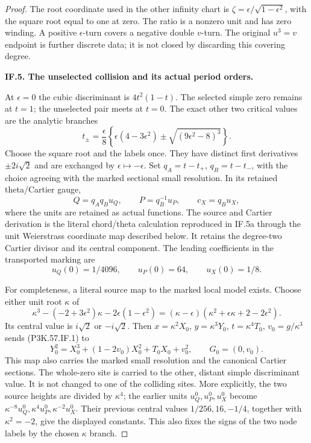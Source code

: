 \begin{proof}
The root coordinate used in the other infinity chart is
\(\zeta=\epsilon/\sqrt{1-\epsilon^2}\), with the square root equal to one
at zero. The ratio is a nonzero unit and has zero winding. A positive
\(\epsilon\)-turn covers a negative double \(v\)-turn. The original
\(u^3=v\) endpoint is further discrete data; it is not closed by
discarding this covering degree.

\par\medskip\noindent\textbf{IF.5. The unselected collision and its actual period orders.}\par\nopagebreak[4]

At \(\epsilon=0\) the cubic discriminant is \(4t^2(1-t)\). The selected
simple zero remains at \(t=1\); the unselected pair meets at \(t=0\).
The exact other two critical values are the analytic branches
\[
 t_\pm=\frac{\epsilon}{8}
 \left\{\epsilon(4-3\epsilon^2)
          \pm\sqrt{(9\epsilon^2-8)^3}\right\}.           \tag{P3K.57.IF.13}
\]
Choose the square root and the labels once. They have distinct first
derivatives \(\pm2i\sqrt2\) and are exchanged by \(\epsilon\mapsto-\epsilon\).
Set \(q_A=t-t_+\), \(q_B=t-t_-\), with the choice agreeing with the marked
sectional small resolution. In its retained theta/Cartier gauge,
\[
 Q=q_Aq_Bu_Q,\qquad P=q_B^{-1}u_P,\qquad
 c_X=q_Bu_X,                                           \tag{P3K.57.IF.14}
\]
where the units are retained as actual functions. The source and
Cartier derivation is the literal chord/theta calculation reproduced
in IF.5a through the unit Weierstrass coordinate map described below.
It retains the degree-two Cartier divisor and its central component.
The leading coefficients in the transported marking are
\[
               u_Q(0)=1/4096,\qquad u_P(0)=64,\qquad u_X(0)=1/8 .
\]

For completeness, a literal source map to the marked local model exists.
Choose either unit root \(\kappa\) of
\[
 \kappa^3-(-2+3\epsilon^2)\kappa-2\epsilon(1-\epsilon^2)
 =(\kappa-\epsilon)(\kappa^2+\epsilon\kappa+2-2\epsilon^2).
\]
Its central value is \(i\sqrt2\) or \(-i\sqrt2\).
Then \(x=\kappa^2 X_0\), \(y=\kappa^3Y_0\),
\(t=\kappa^4T_0\), \(v_0=g/\kappa^3\) sends (P3K.57.IF.1) to
\[
 Y_0^2=X_0^3+(1-2v_0)X_0^2+T_0X_0+v_0^2,\qquad G_0=(0,v_0).
\]
This map also carries the marked small resolution and the canonical
Cartier sections. The whole-zero site is carried to the other, distant
simple discriminant value. It is not changed to one of the colliding sites.
More explicitly, the two source heights are divided by \(\kappa^4\);
the earlier units \(u_Q^0,u_P^0,u_X^0\) become
\(\kappa^{-8}u_Q^0,\kappa^4u_P^0,\kappa^{-2}u_X^0\).
Their previous central values \(1/256,16,-1/4\), together with
\(\kappa^2=-2\), give the displayed constants. This also fixes the signs
of the two node labels by the chosen \(\kappa\) branch.


\end{proof}
